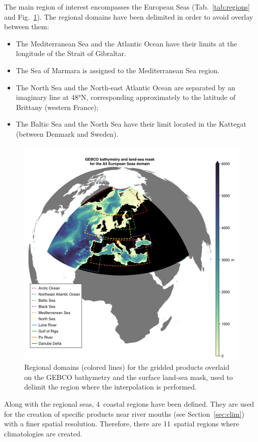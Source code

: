 \documentclass[essd,manuscript]{copernicus}
\begin{document}
The main region of interest encompasses the European Seas (Tab.~\ref{tab:regions} and Fig.~\ref{fig:gebco_bathy_mask_domains3}). The regional domains have been delimited in order to avoid overlay between them:
\begin{itemize}
\item The Mediterranean Sea and the Atlantic Ocean have their limits at the longitude of the Strait of Gibraltar.
\item The Sea of Marmara is assigned to the Mediterranean Sea region.
\item The North Sea and the North-east Atlantic Ocean are separated by an imaginary line at 48°N, corresponding approximately to the latitude of Brittany (western France);
\item The Baltic Sea and the North Sea have their limit located in the Kattegat (between Denmark and Sweden).
\end{itemize}

\begin{figure}[t]
\includegraphics[width=12cm]{gebco_bathy_mask_domains3}
\caption{Regional domains (colored lines) for the gridded products overlaid on the GEBCO bathymetry and the surface land-sea mask, used to delimit the region where the interpolation is performed.\label{fig:gebco_bathy_mask_domains3}}
\end{figure}

Along with the regional seas, 4~coastal regions have been defined. They are used for the creation of specific products near river mouths (see Section~\ref{sec:clim}) with a finer spatial resolution. Therefore, there are 11~spatial regions where climatologies are created.
\end{document}
